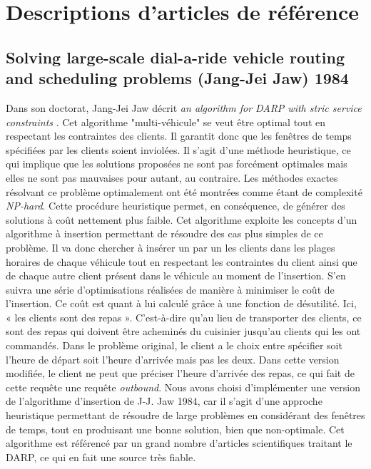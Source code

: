 \documentclass[10pt,a4paper]{report}
\begin{document}
\section*{Descriptions d'articles de référence}
\subsection*{Solving large-scale dial-a-ride vehicle routing and scheduling problems (Jang-Jei Jaw) 1984 }
Dans son doctorat, Jang-Jei Jaw décrit \textit{\og an algorithm for DARP with stric service constraints \fg{}}.  Cet algorithme "multi-véhicule" se veut être optimal tout en respectant les contraintes des clients.
Il garantit donc que les fenêtres de temps spécifiées par les clients soient inviolées.
Il s'agit d'une méthode heuristique, ce qui implique que les solutions proposées ne sont pas forcément optimales mais elles ne sont pas mauvaises pour autant, au contraire. Les méthodes exactes résolvant ce problème optimalement ont été montrées comme étant de complexité \textit{NP-hard}. %
Cette procédure heuristique permet, en conséquence, de générer des solutions à coût nettement plus faible.%
Cet algorithme exploite les concepts d'un algorithme à insertion permettant de résoudre des cas plus simples de ce problème. Il va donc chercher à insérer un par un les clients dans les plages horaires de chaque véhicule tout en respectant les contraintes du client ainsi que de chaque autre client présent dans le véhicule au moment de l'insertion.
S'en suivra une série d'optimisations réalisées de manière à minimiser le coût de l'insertion. Ce coût est quant à lui calculé grâce à une fonction de désutilité. Ici, « les clients sont des repas ». C'est-à-dire qu'au lieu de transporter des clients, ce sont des repas qui doivent être acheminés du cuisinier jusqu'au clients qui les ont commandés.
Dans le problème original, le client a le choix entre spécifier soit l'heure de départ soit l'heure d'arrivée mais pas les deux. Dans cette version modifiée, le client ne peut que préciser l'heure d'arrivée des repas, ce qui fait de cette requête une requête \textit{outbound}. 
\newline
Nous avons choisi d'implémenter une version de l'algorithme d'insertion de J-J. Jaw 1984, car il s'agit d'une approche heuristique permettant de résoudre de large problèmes en considérant des fenêtres de temps, tout en produisant une bonne solution, bien que non-optimale. Cet algorithme est référencé par un grand nombre d'articles scientifiques traitant le DARP, ce qui en fait une source très fiable.
\end{document}
